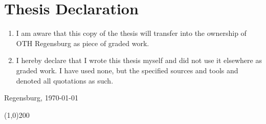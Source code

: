 \thispagestyle{empty}
\section*{Thesis Declaration}

\bigskip
\bigskip 
\bigskip 

\begin{enumerate}
      \item I am aware that this copy of the thesis will transfer into the ownership of OTH Regensburg as piece of graded work.
    \item I hereby declare that I wrote this thesis myself and did not use it elsewhere as graded work. I have used none, but the specified sources and tools and denoted all quotations as such. 
\end{enumerate}

\bigskip 
\bigskip 
\bigskip 

Regensburg, \today

\bigskip 
\bigskip

\line(1,0){200}
\newline
\studierenderName